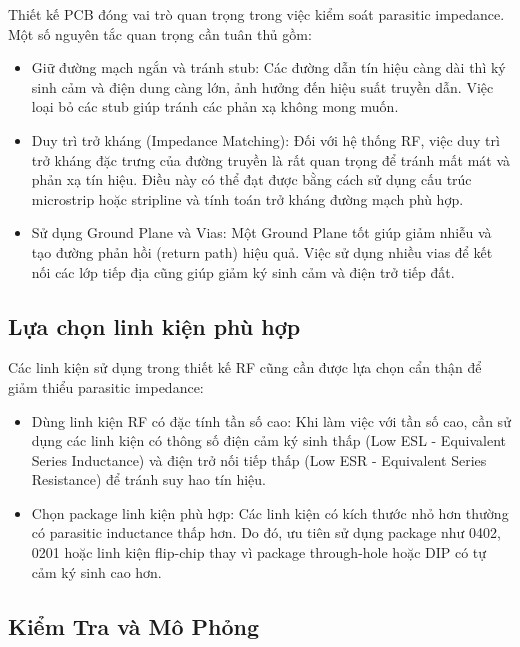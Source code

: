 \hspace{13pt} Thiết kế PCB đóng vai trò quan trọng trong việc kiểm soát parasitic impedance. Một số nguyên tắc quan trọng cần tuân thủ gồm:
\begin{itemize}
    \item Giữ đường mạch ngắn và tránh stub: Các đường dẫn tín hiệu càng dài thì ký sinh cảm và điện dung càng lớn, ảnh hưởng đến hiệu suất truyền dẫn. Việc loại bỏ các stub giúp tránh các phản xạ không mong muốn.
    \item Duy trì trở kháng (Impedance Matching): Đối với hệ thống RF, việc duy trì trở kháng đặc trưng của đường truyền là rất quan trọng để tránh mất mát và phản xạ tín hiệu. Điều này có thể đạt được bằng cách sử dụng cấu trúc microstrip hoặc stripline và tính toán trở kháng đường mạch phù hợp.
    \item Sử dụng Ground Plane và Vias: Một Ground Plane tốt giúp giảm nhiễu và tạo đường phản hồi (return path) hiệu quả. Việc sử dụng nhiều vias để kết nối các lớp tiếp địa cũng giúp giảm ký sinh cảm và điện trở tiếp đất.
\end{itemize}

\subsection{Lựa chọn linh kiện phù hợp}

\hspace{13pt} Các linh kiện sử dụng trong thiết kế RF cũng cần được lựa chọn cẩn thận để giảm thiểu parasitic impedance:
\begin{itemize}
    \item Dùng linh kiện RF có đặc tính tần số cao: Khi làm việc với tần số cao, cần sử dụng các linh kiện có thông số điện cảm ký sinh thấp (Low ESL - Equivalent Series Inductance) và điện trở nối tiếp thấp (Low ESR - Equivalent Series Resistance) để tránh suy hao tín hiệu.
    \item Chọn package linh kiện phù hợp: Các linh kiện có kích thước nhỏ hơn thường có parasitic inductance thấp hơn. Do đó, ưu tiên sử dụng package như 0402, 0201 hoặc linh kiện flip-chip thay vì package through-hole hoặc DIP có tự cảm ký sinh cao hơn.
\end{itemize}

\subsection{Kiểm Tra và Mô Phỏng}

